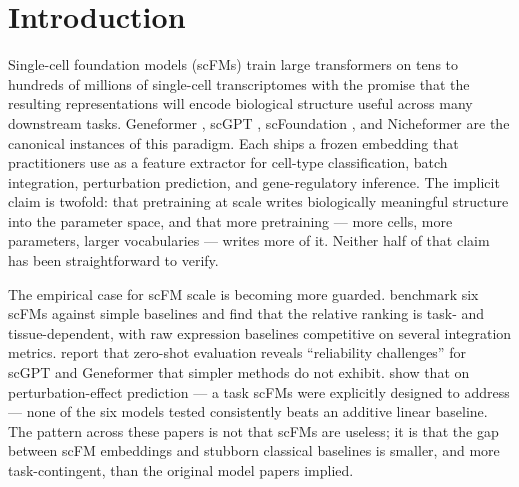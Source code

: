 \documentclass[
  11pt,
]{article}
\begin{document}
\section{Introduction}\label{introduction}

Single-cell foundation models (scFMs) train large transformers on tens
to hundreds of millions of single-cell transcriptomes with the promise
that the resulting representations will encode biological structure
useful across many downstream tasks. Geneformer \citep{theodoris2023},
scGPT \citep{cui2024}, scFoundation \citep{hao2024scfoundation}, and Nicheformer
\citep{schaar2025nicheformer} are the canonical instances of this paradigm. Each
ships a frozen embedding that practitioners use as a feature extractor
for cell-type classification, batch integration, perturbation
prediction, and gene-regulatory inference. The implicit claim is
twofold: that pretraining at scale writes biologically meaningful
structure into the parameter space, and that more pretraining --- more
cells, more parameters, larger vocabularies --- writes more of it.
Neither half of that claim has been straightforward to verify.

The empirical case for scFM scale is becoming more guarded. \citet{boiarsky2025} benchmark six scFMs against simple baselines and find that
the relative ranking is task- and tissue-dependent, with raw expression
baselines competitive on several integration metrics. \citet{kedzierska2025} report that zero-shot evaluation reveals ``reliability
challenges'' for scGPT and Geneformer that simpler methods do not
exhibit. \citet{ahlmanneltze2025perturbation} show that on
perturbation-effect prediction --- a task scFMs were explicitly designed
to address --- none of the six models tested consistently beats an
additive linear baseline. The pattern across these papers is not that
scFMs are useless; it is that the gap between scFM embeddings and
stubborn classical baselines is smaller, and more task-contingent, than
the original model papers implied.
\end{document}
